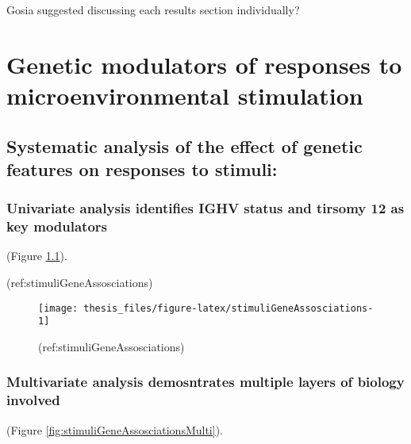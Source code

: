 \documentclass[11pt, a4paper, twosided]{book}
\begin{document}
Gosia suggested discussing each results section individually?

\hypertarget{genetic-modulators-of-responses-to-microenvironmental-stimulation}{%
\chapter{Genetic modulators of responses to microenvironmental stimulation}\label{genetic-modulators-of-responses-to-microenvironmental-stimulation}}

\hypertarget{systematic-analysis-of-the-effect-of-genetic-features-on-responses-to-stimuli}{%
\section{Systematic analysis of the effect of genetic features on responses to stimuli:}\label{systematic-analysis-of-the-effect-of-genetic-features-on-responses-to-stimuli}}

\hypertarget{univariate-analysis-identifies-ighv-status-and-tirsomy-12-as-key-modulators}{%
\subsection{Univariate analysis identifies IGHV status and tirsomy 12 as key modulators}\label{univariate-analysis-identifies-ighv-status-and-tirsomy-12-as-key-modulators}}

(Figure \ref{fig:stimuliGeneAssosciations}).

(ref:stimuliGeneAssosciations)
\begin{figure}

{\centering \texttt{[image: thesis\_files/figure-latex/stimuliGeneAssosciations-1]} 

}

\caption{(ref:stimuliGeneAssosciations)}\label{fig:stimuliGeneAssosciations}
\end{figure}
\hypertarget{multivariate-analysis-demosntrates-multiple-layers-of-biology-involved}{%
\subsection{Multivariate analysis demosntrates multiple layers of biology involved}\label{multivariate-analysis-demosntrates-multiple-layers-of-biology-involved}}

(Figure \ref{fig:stimuliGeneAssosciationsMulti}).
\end{document}
